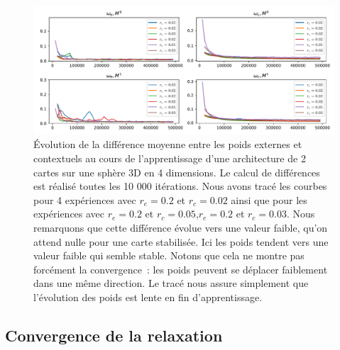 \documentclass[../main]{subfiles}
\begin{document}
\begin{figure}
	\includegraphics[width=\textwidth]{evol_convergence_poids.pdf}
	\caption{\'Evolution de la différence moyenne entre les poids externes et contextuels au cours de l'apprentissage d'une architecture de 2 cartes sur une sphère 3D en 4 dimensions. Le calcul de différences est réalisé toutes les 10 000 itérations. Nous avons tracé les courbes pour 4 expériences avec $r_e = 0.2$ et $r_c = 0.02$ ainsi que pour les expériences avec $r_e = 0.2$ et $r_c = 0.05$,$r_e = 0.2$ et $r_c = 0.03$. Nous remarquons que cette différence évolue vers une valeur faible, qu'on attend nulle pour une carte stabilisée. Ici les poids tendent vers une valeur faible qui semble stable. Notons que cela ne montre pas forcément la convergence~: les poids peuvent se déplacer faiblement dans une même direction. Le tracé nous assure simplement que l'évolution des poids est lente en fin d'apprentissage. \label{fig:conv_poids}}
\end{figure}

\subsection{Convergence de la relaxation}
\end{document}
